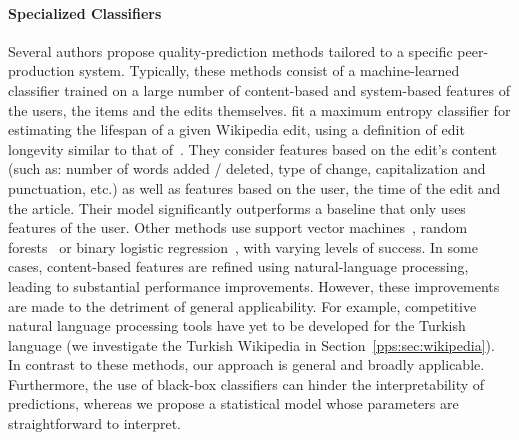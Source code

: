\paragraph{Specialized Classifiers}
Several authors propose quality-prediction methods tailored to a specific peer-production system.
Typically, these methods consist of a machine-learned classifier trained on a large number of content-based and system-based features of the users, the items and the edits themselves.
\citet{druck2008learning} fit a maximum entropy classifier for estimating the lifespan of a given Wikipedia edit, using a definition of edit longevity similar to that of~\citet{adler2007content}.
They consider features based on the edit's content (such as: number of words added / deleted, type of change, capitalization and punctuation, etc.) as well as features based on the user, the time of the edit and the article.
Their model significantly outperforms a baseline that only uses features of the user.
Other methods use support vector machines~\citep{bronner2012user}, random forests~\citep{bronner2012user, javanmardi2011vandalism} or binary logistic regression~\citep{potthast2008automatic}, with varying levels of success.
In some cases, content-based features are refined using natural-language processing, leading to substantial performance improvements.
However, these improvements are made to the detriment of general applicability.
For example, competitive natural language processing tools have yet to be developed for the Turkish language (we investigate the Turkish Wikipedia in Section~\ref{pps:sec:wikipedia}).
In contrast to these methods, our approach is general and broadly applicable.
Furthermore, the use of black-box classifiers can hinder the interpretability of predictions, whereas we propose a statistical model whose parameters are straightforward to interpret.

